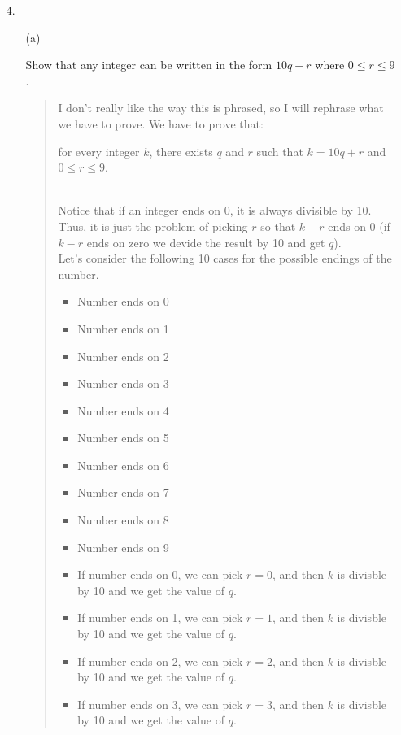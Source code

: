 \documentclass[12pt, a4paper]{article}                      %
\begin{document}
\begin{itemize}
\item[4.]
\begin{itemize}
\item[(a)]
\item[]
Show that any integer can be written in the form $10q + r$ where $0 \leq r \leq 9$.
\begin{quote}
I don't really like the way this is phrased, so I will rephrase what we have to prove.
We have to prove that:\\
\begin{center}
for every integer $k$, there exists $q$ and $r$ such that $k = 10q + r$ and $0 \leq r \leq 9$.\\\
\end{center}
Notice that if an integer ends on 0, it is always divisible by 10. Thus, it is just the problem
of picking $r$ so that $k - r$ ends on 0 (if $k - r$ ends on zero we devide the result by 10 and get $q$).\\
Let's consider the following 10 cases for the possible endings of the number.
\begin{itemize}
\item
Number ends on 0
\item
Number ends on 1
\item
Number ends on 2
\item
Number ends on 3
\item
Number ends on 4
\item
Number ends on 5
\item
Number ends on 6
\item
Number ends on 7
\item
Number ends on 8
\item
Number ends on 9
\\
\end{itemize}
\begin{itemize}
\item
If number ends on 0, we can pick $r = 0$, and then $k$ is divisble by 10 and we get the value of $q$.\\
\item
If number ends on 1, we can pick $r = 1$, and then $k$ is divisble by 10 and we get the value of $q$.\\
\item
If number ends on 2, we can pick $r = 2$, and then $k$ is divisble by 10 and we get the value of $q$.\\
\item
If number ends on 3, we can pick $r = 3$, and then $k$ is divisble by 10 and we get the value of $q$.\\

\end{itemize}
\end{quote}
\end{itemize}
\end{itemize}
\end{document}
